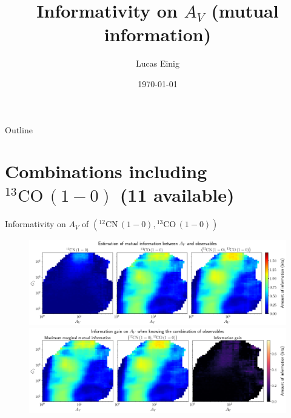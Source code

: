 \documentclass{beamer}
\title{Informativity on $A_V$ (mutual information)}
\author{Lucas Einig}
\institute{IRAM - GIPSA-lab}
\date{\today}
\begin{document}
\begin{frame}
  \titlepage
\end{frame}

\begin{frame}{Outline}
  \tableofcontents
\end{frame}


\section{Combinations including $\mathrm{^{13}CO\,(1-0)}$ (11 available)}

\begin{frame}{Informativity on $A_V$ of $\left(\mathrm{^{12}CN\,(1-0)},\mathrm{^{13}CO\,(1-0)}\right)$}
    \begin{figure}
        \centering
        \includegraphics[width=0.95\linewidth]{../mi/av__12cn10_13co10_mi.png}
        \vfill
        \includegraphics[width=0.95\linewidth]{../mi/av__12cn10_13co10_mi_gain.png}
    \end{figure}
\end{frame}
\end{document}
